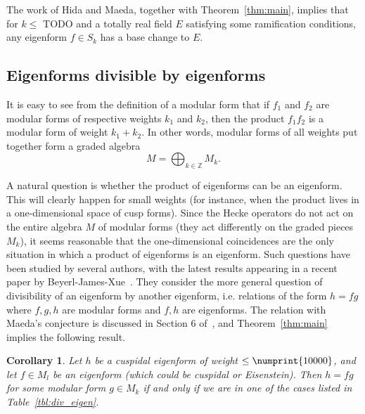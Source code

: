 \documentclass[11pt]{article}
\theoremstyle{plain}
\newtheorem{corollary}[theorem]{Corollary}
\theoremstyle{definition}
\theoremstyle{remark}
\numberwithin{equation}{section}
\newcommand{\ZZ}{\mathbb{Z}}
\newcommand{\bound}{\numprint{10000}}
\begin{document}
The work of Hida and Maeda, together with Theorem~\ref{thm:main}, implies that
for $k\leq$ TODO and a totally real field $E$ satisfying some ramification
conditions, any eigenform $f\in S_k$ has a base change to $E$.

\subsection{Eigenforms divisible by eigenforms}
It is easy to see from the definition of a modular form that if $f_1$ and
$f_2$ are modular forms of respective weights $k_1$ and $k_2$, then the
product $f_1f_2$ is a modular form of weight $k_1+k_2$.  In other words,
modular forms of all weights put together form a graded algebra
\begin{equation*}
  M=\bigoplus_{k\in\ZZ} M_k.
\end{equation*}

A natural question is whether the product of eigenforms can be an eigenform.
This will clearly happen for small weights (for instance, when the product
lives in a one-dimensional space of cusp forms).  Since the Hecke operators
do not act on the entire algebra $M$ of modular forms (they act
differently on the graded pieces $M_k$), it seems reasonable that the
one-dimensional coincidences are the only situation in which a product of
eigenforms is an eigenform.  Such questions have been studied by several
authors, with the latest results appearing in a recent paper by
Beyerl-James-Xue~\cite{BeyerlJamesXue}.  They consider the more general question
of divisibility of an
eigenform by another eigenform, i.e. relations of the form $h=fg$ where
$f,g,h$ are modular forms and $f,h$ are eigenforms.  The relation with Maeda's 
conjecture is discussed in Section 6 of~\cite{BeyerlJamesXue}, and 
Theorem~\ref{thm:main} implies the following result.

\begin{corollary}
  Let $h$ be a cuspidal eigenform of weight $\leq\bound$, and let 
  $f\in M_l$ be an eigenform
  (which could be cuspidal or Eisenstein).  Then $h=fg$ for some modular form
  $g\in M_k$ if and only if we are in one of the cases listed in 
  Table~\ref{tbl:div_eigen}.
\end{corollary}
\end{document}
